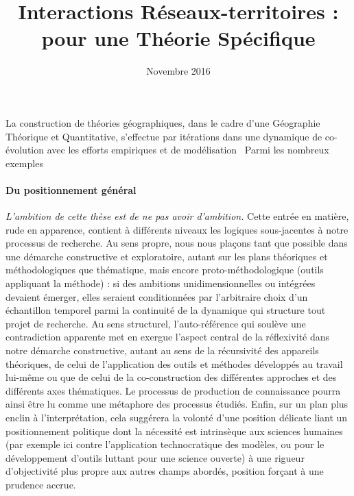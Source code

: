 




\title{Interactions Réseaux-territoires : pour une Théorie Spécifique}
\author{}
\date{Novembre 2016}


\maketitle

\justify


\begin{abstract}
\end{abstract}





La construction de théories géographiques, dans le cadre d'une Géographie Théorique et Quantitative, s'effectue par itérations dans une dynamique de co-évolution avec les efforts empiriques et de modélisation~\cite{} %
Parmi les nombreux exemples


\paragraph{Du positionnement général}

\emph{L'ambition de cette thèse est de ne pas avoir d'ambition.} Cette entrée en matière, rude en apparence, contient à différents niveaux les logiques sous-jacentes à notre processus de recherche. Au sens propre, nous nous plaçons tant que possible dans une démarche constructive et exploratoire, autant sur les plans théoriques et méthodologiques que thématique, mais encore proto-méthodologique (outils appliquant la méthode) : si des ambitions unidimensionnelles ou intégrées devaient émerger, elles seraient conditionnées par l'arbitraire choix d'un échantillon temporel parmi la continuité de la dynamique qui structure tout projet de recherche. Au sens structurel, l'auto-référence qui soulève une contradiction apparente met en exergue l'aspect central de la réflexivité dans notre démarche constructive, autant au sens de la récursivité des appareils théoriques, de celui de l'application des outils et méthodes développés au travail lui-même ou que de celui de la co-construction des différentes approches et des différents axes thématiques. Le processus de production de connaissance pourra ainsi être lu comme une métaphore des processus étudiés. Enfin, sur un plan plus enclin à l'interprétation, cela suggérera la volonté d'une position délicate liant un positionnement politique dont la nécessité est intrinsèque aux sciences humaines (par exemple ici contre l'application technocratique des modèles, ou pour le développement d'outils luttant pour une science ouverte) à une rigueur d'objectivité plus propre aux autres champs abordés, position forçant à une prudence accrue.


